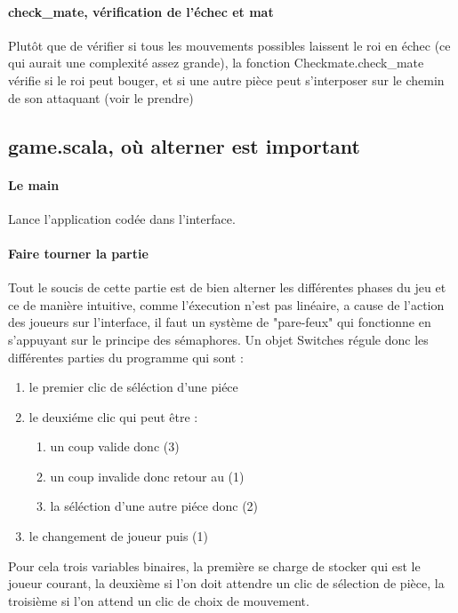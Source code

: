 \documentclass[a4paper]{article}
\begin{document}
\paragraph{check\_mate, vérification de l'échec et mat} Plutôt que de vérifier si tous les mouvements possibles laissent le roi en échec (ce qui aurait une complexité assez grande), la fonction Checkmate.check\_mate vérifie si le roi peut bouger, et si une autre pièce peut s'interposer sur le chemin de son attaquant (voir le prendre)


\subsection{game.scala, où alterner est important}

\paragraph{Le main} Lance l'application codée dans l'interface.

\paragraph{Faire tourner la partie} Tout le soucis de cette partie est de bien alterner les différentes phases du jeu et ce de manière intuitive, comme l'éxecution n'est pas linéaire, a cause de l'action des joueurs sur l'interface, il faut un système de "pare-feux" qui fonctionne en s'appuyant sur le principe des sémaphores. Un objet Switches régule donc les différentes parties du programme qui sont  : \\

\begin{enumerate}
	\item le premier clic de séléction d'une piéce
	\item le deuxiéme clic qui peut être :
		\begin{enumerate}
		\item un coup valide donc (3)
		\item un coup invalide donc retour au (1)
		\item la séléction d'une autre piéce donc (2)
		\end{enumerate}
	\item le changement de joueur puis (1)
\end{enumerate}
\vspace{0.5 cm}

Pour cela trois variables binaires, la première se charge de stocker qui est le joueur courant, la deuxième si l'on doit attendre un clic de sélection de pièce, la troisième si l'on attend un clic de choix de mouvement.\\
\end{document}
